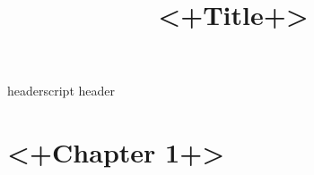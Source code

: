  {headerscript}
 {header}


\title{<+Title+>}
\maketitle

\tableofcontents

\chapter{<+Chapter 1+>}


